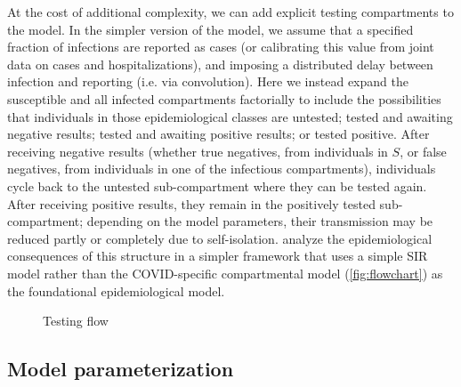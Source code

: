 \documentclass[12pt]{article}\usepackage[]{graphicx}\usepackage[]{color}
\begin{document}
At the cost of additional complexity, we can add explicit testing compartments to the model.
In the simpler version of the model, we assume that a specified fraction of infections
are reported as cases (or calibrating this value
from joint data on cases and hospitalizations), and imposing a
distributed delay between infection and reporting (i.e. via convolution).
Here we instead expand the susceptible
and all infected compartments factorially to include the possibilities that individuals in those epidemiological classes
are untested; tested and awaiting negative results; tested and awaiting positive results; or tested positive.
After receiving negative results (whether true negatives, from individuals in $S$, or false negatives,
from individuals in one of the infectious compartments), individuals cycle back to the untested sub-compartment
where they can be tested again. After receiving positive results, they remain in the positively tested sub-compartment;
depending on the model parameters, their transmission may be reduced partly or completely due to self-isolation.
\cite{Ghar+22} analyze the epidemiological consequences of this structure in a simpler framework that uses
a simple SIR model rather than the COVID-specific compartmental model (\cref{fig:flowchart}) as the foundational
epidemiological model.


\begin{figure}
  \caption{Testing flow}
  \label{fig:testing_flow}
\end{figure}

\subsection*{Model parameterization}
\end{document}
